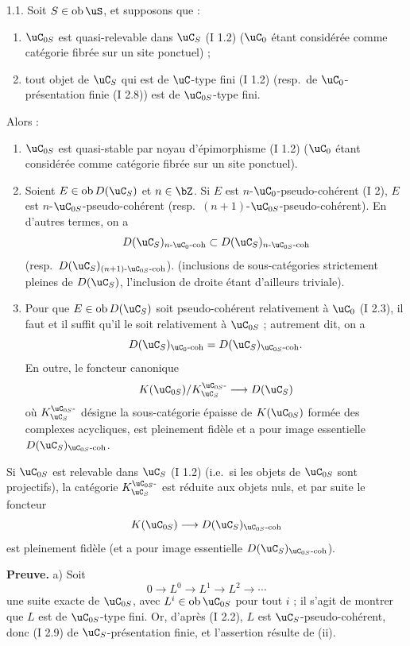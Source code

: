 \begin{proposition} 1.1.
Soit $S \in \operatorname{ob} \uS$, et supposons que :
\begin{enumerate}
\item[(i)] $\uC_{0S}$ est quasi-relevable dans $\uC_S$ (I 1.2) ($\uC_0$ \'{e}tant consid\'{e}r\'{e}e comme cat\'{e}gorie fibr\'{e}e sur un site ponctuel) ;
\item[(ii)] tout objet de $\uC_S$ qui est de $\uC$-type fini (I 1.2) (resp.~de $\uC_0$-pr\'{e}sentation finie (I 2.8)) est de $\uC_{0S}$-type fini.
\end{enumerate}
Alors :
\begin{enumerate}
\item[a)] $\uC_{0S}$ est quasi-stable par noyau d'\'{e}pimorphisme (I 1.2) ($\uC_0$ \'{e}tant consid\'{e}r\'{e}e comme cat\'{e}gorie fibr\'{e}e sur un site ponctuel).
\item[b)] Soient $E \in \operatorname{ob} D(\uC_S)$ et $n \in \bZ$. Si $E$ est $n$-$\uC_0$-pseudo-coh\'{e}rent (I 2), $E$ est $n$-$\uC_{0S}$-pseudo-coh\'{e}rent (resp.~$(n+1)$-$\uC_{0S}$-pseudo-coh\'{e}rent). En d'autres termes, on a
\[
D(\uC_S)_{n\text{-}\uC_0\text{-coh}} \subset D(\uC_S)_{n\text{-}\uC_{0S}\text{-coh}}
\]
(resp.~$D(\uC_S)_{(n+1)\text{-}\uC_{0S}\text{-coh}}$).
(inclusions de sous-cat\'{e}gories strictement pleines de $D(\uC_S)$, l'inclusion de droite \'{e}tant d'ailleurs triviale).
\item[c)] Pour que $E \in \operatorname{ob} D(\uC_S)$ soit pseudo-coh\'{e}rent relativement \`{a} $\uC_0$ (I 2.3), il faut et il suffit qu'il le soit relativement \`{a} $\uC_{0S}$ ; autrement dit, on a
\[
D(\uC_S)_{\uC_0\text{-coh}} = D(\uC_S)_{\uC_{0S}\text{-coh}} .
\]
En outre, le foncteur canonique
\[
K(\uC_{0S}) / K^{\uC_{0S}\text{-}}_{\uC_S} \longrightarrow D(\uC_S)
\]
o\`{u} $K^{\uC_{0S}\text{-}}_{\uC_S}$ d\'{e}signe la sous-cat\'{e}gorie \'{e}paisse de $K(\uC_{0S})$ form\'{e}e des complexes acycliques, est pleinement fid\`{e}le et a pour image essentielle $D(\uC_S)_{\uC_{0S}\text{-coh}}$.
\end{enumerate}
Si $\uC_{0S}$ est relevable dans $\uC_S$ (I 1.2) (i.e.~si les objets de $\uC_{0S}$ sont projectifs), la cat\'{e}gorie $K^{\uC_{0S}\text{-}}_{\uC_S}$ est r\'{e}duite aux objets nuls, et par suite le foncteur
\[
K(\uC_{0S}) \longrightarrow D(\uC_S)_{\uC_{0S}\text{-coh}}
\]
est pleinement fid\`{e}le (et a pour image essentielle $D(\uC_S)_{\uC_{0S}\text{-coh}}$).
\end{proposition}


\noindent\textbf{Preuve.} a) Soit
\[
0 \longrightarrow L^0 \longrightarrow L^1 \longrightarrow L^2 \longrightarrow \cdots
\]
une suite exacte de $\uC_{0S}$, avec $L^i \in \operatorname{ob} \uC_{0S}$ pour tout $i$ ; il s'agit de montrer que $L$ est de $\uC_{0S}$-type fini. Or, d'apr\`{e}s (I 2.2), $L$ est $\uC_S$-pseudo-coh\'{e}rent, donc (I 2.9) de $\uC_S$-pr\'{e}sentation finie, et l'assertion r\'{e}sulte de (ii).

